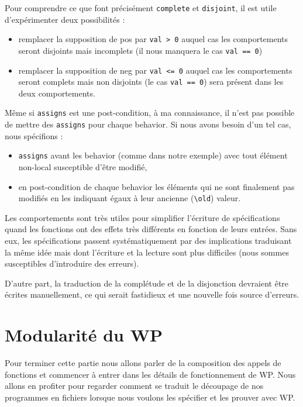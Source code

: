 \documentclass[12pt,francais,]{scrbook}
\providecommand{\tightlist}{%
  \setlength{\itemsep}{0pt}\setlength{\parskip}{0pt}}
\newenvironment{zdsalertblock}[1]{%
  \tcolorbox[beamer,%
    noparskip,breakable,
    colback=LightCoral,colframe=DarkRed,%
    colbacklower=Tomato,%
    title=#1]
}{\endtcolorbox}
\begin{document}
Pour comprendre ce que font précisément \texttt{complete} et
\texttt{disjoint}, il est utile d'expérimenter deux possibilités :

\begin{itemize}
\tightlist
\item
  remplacer la supposition de \og{}pos\fg{} par
  \texttt{val\ \textgreater{}\ 0} auquel cas les comportements seront
  disjoints mais incomplets (il nous manquera le cas
  \texttt{val\ ==\ 0})
\item
  remplacer la supposition de \og{}neg\fg{} par \texttt{val\ \textless{}=\ 0}
  auquel cas les comportements seront complets mais non disjoints (le
  cas \texttt{val\ ==\ 0}) sera présent dans les deux comportements.
\end{itemize}

\begin{zdsalertblock}{Attention}
  Même si \texttt{assigns} est une
  post-condition, à ma connaissance, il n'est pas possible de
  mettre des \texttt{assigns} pour chaque behavior. Si nous avons
  besoin d'un tel cas, nous spécifions :
  \begin{itemize}
  \item \texttt{assigns} avant les behavior (comme dans notre exemple) avec
    tout élément non-local susceptible d'être modifié,
  \item en post-condition de chaque behavior les éléments qui ne sont
    finalement pas modifiés en les indiquant égaux à leur
    ancienne (\texttt{\textbackslash{}old}) valeur.
  \end{itemize}
\end{zdsalertblock}

Les comportements sont très utiles pour simplifier l'écriture de
spécifications quand les fonctions ont des effets très différents en
fonction de leurs entrées. Sans eux, les spécifications passent
systématiquement par des implications traduisant la même idée mais dont
l'écriture et la lecture sont plus difficiles (nous sommes susceptibles
d'introduire des erreurs).

D'autre part, la traduction de la complétude et de la disjonction
devraient être écrites manuellement, ce qui serait fastidieux et une
nouvelle fois source d'erreurs.

\section{Modularité du WP}\label{modularituxe9-du-wp}

Pour terminer cette partie nous allons parler de la composition des
appels de fonctions et commencer à entrer dans les détails de
fonctionnement de WP. Nous allons en profiter pour regarder comment se
traduit le découpage de nos programmes en fichiers lorsque nous voulons
les spécifier et les prouver avec WP.
\end{document}
